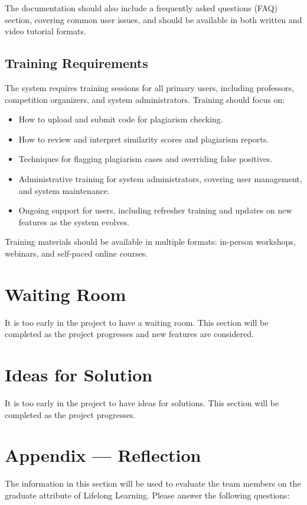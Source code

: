 \documentclass[12pt]{article}
\begin{document}
The documentation should also include a frequently asked questions (FAQ) section, covering common user issues, and should be available in both written and video tutorial formats.

\subsection{Training Requirements}
The system requires training sessions for all primary users, including professors, competition organizers, and system administrators. Training should focus on:
\begin{itemize}
    \item How to upload and submit code for plagiarism checking.
    \item How to review and interpret similarity scores and plagiarism reports.
    \item Techniques for flagging plagiarism cases and overriding false positives.
    \item Administrative training for system administrators, covering user management, and system maintenance.
    \item Ongoing support for users, including refresher training and updates on new features as the system evolves.
\end{itemize}

Training materials should be available in multiple formats: in-person workshops, webinars, and self-paced online courses.


\section{Waiting Room}
It is too early in the project to have a waiting room. This section will be completed as the project progresses and new features are considered.

\section{Ideas for Solution}
It is too early in the project to have ideas for solutions. This section will be completed as the project progresses.

\newpage{}
\section*{Appendix --- Reflection}

The information in this section will be used to evaluate the team members on the
graduate attribute of Lifelong Learning.  Please answer the following questions:
\end{document}
